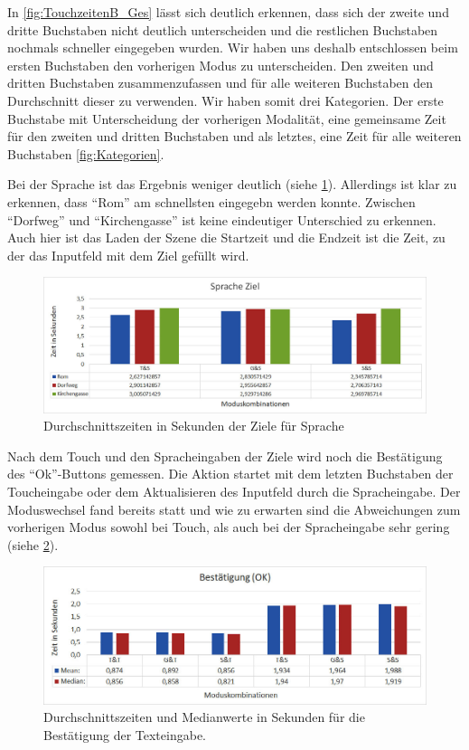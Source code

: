 In \ref{fig:TouchzeitenB_Ges} lässt sich deutlich erkennen, dass sich der zweite und dritte Buchstaben nicht deutlich unterscheiden und die restlichen Buchstaben nochmals schneller eingegeben wurden. 
Wir haben uns deshalb entschlossen beim ersten Buchstaben den vorherigen Modus zu unterscheiden. 
Den zweiten und dritten Buchstaben zusammenzufassen und für alle weiteren Buchstaben den Durchschnitt dieser zu verwenden. 
Wir haben somit drei Kategorien.
Der erste Buchstabe mit Unterscheidung der vorherigen Modalität, eine gemeinsame Zeit für den zweiten und dritten Buchstaben und als letztes, eine Zeit für alle weiteren Buchstaben \ref{fig:Kategorien}.

Bei der Sprache ist das Ergebnis weniger deutlich (siehe \ref{fig:SpracheZiel}).
Allerdings ist klar zu erkennen, dass "`Rom"' am schnellsten eingegebn werden konnte. 
Zwischen "`Dorfweg"' und "`Kirchengasse"' ist keine eindeutiger Unterschied zu erkennen. 
Auch hier ist das Laden der Szene die Startzeit und die Endzeit ist die Zeit, zu der das Inputfeld mit dem Ziel gefüllt wird.
\begin{figure}[ht]
  \centering
  \includegraphics[width=1\textwidth]{img/SpracheZiel.JPG}
  \caption{Durchschnittszeiten in Sekunden der Ziele für Sprache}
  \label{fig:SpracheZiel}
\end{figure} 

Nach dem Touch und den Spracheingaben der Ziele wird noch die Bestätigung des "`Ok"'-Buttons gemessen. 
Die Aktion startet mit dem letzten Buchstaben der Toucheingabe oder dem Aktualisieren des Inputfeld durch die Spracheingabe. 
Der Moduswechsel fand bereits statt und wie zu erwarten sind die Abweichungen zum vorherigen Modus sowohl bei Touch, als auch bei der Spracheingabe sehr gering (siehe \ref{fig:Bestaetigung_OK}).
\begin{figure}[ht]
  \centering
  \includegraphics[width=1\textwidth]{img/B_OK.jpg}
  \caption{Durchschnittszeiten und Medianwerte in Sekunden für die Bestätigung der Texteingabe.}
  \label{fig:Bestaetigung_OK}
\end{figure} 


